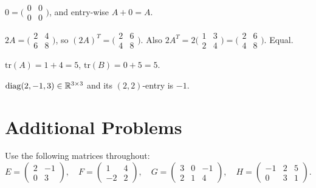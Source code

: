 \begin{solutions}
  \item $0 = \bigl(\begin{smallmatrix} 0 & 0 \\ 0 & 0 \end{smallmatrix}\bigr)$, and entry-wise $A + 0 = A$.

  \item $2 A = \bigl(\begin{smallmatrix} 2 & 4 \\ 6 & 8 \end{smallmatrix}\bigr)$, so $(2 A)^{T} = \bigl(\begin{smallmatrix} 2 & 6 \\ 4 & 8 \end{smallmatrix}\bigr)$. Also $2 A^{T} = 2 \bigl(\begin{smallmatrix} 1 & 3 \\ 2 & 4 \end{smallmatrix}\bigr) = \bigl(\begin{smallmatrix} 2 & 6 \\ 4 & 8 \end{smallmatrix}\bigr)$. Equal.

  \item $\mathrm{tr}(A) = 1 + 4 = 5$, $\mathrm{tr}(B) = 0 + 5 = 5$.

  \item $\mathrm{diag}(2, -1, 3) \in \mathbb{R}^{3 \times 3}$ and its $(2,2)$-entry is $-1$.
\end{solutions}

\section{Additional Problems}

Use the following matrices throughout:
\[
E = \begin{pmatrix} 2 & -1 \\ 0 & 3 \end{pmatrix}, \quad
F = \begin{pmatrix} 1 & 4 \\ -2 & 2 \end{pmatrix}, \quad
G = \begin{pmatrix} 3 & 0 & -1 \\ 2 & 1 & 4 \end{pmatrix}, \quad
H = \begin{pmatrix} -1 & 2 & 5 \\ 0 & 3 & 1 \end{pmatrix}.
\]

